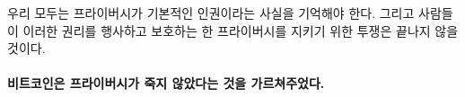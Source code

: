 \begin{comment}
	We should all remember that privacy is a fundamental human right\footnote{Universal Declaration of Human Rights, \textit{Article 12}.~\cite{article12}}. And as long
	as people exercise and defend these rights the battle for privacy is far from
	over.
\end{comment}
우리 모두는 프라이버시가 기본적인 인권이라는 사실을 기억해야 한다.\cite{article12}
그리고 사람들이 이러한 권리를 행사하고 보호하는 한 프라이버시를 지키기 위한 투쟁은 끝나지 않을 것이다.

\paragraph{비트코인은 프라이버시가 죽지 않았다는 것을 가르쳐주었다.}

%
%
%
%
